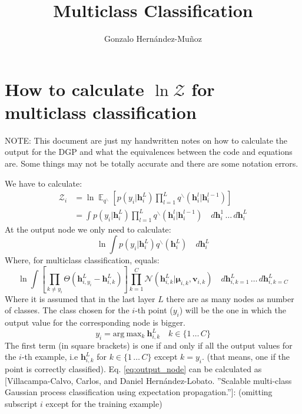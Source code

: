 \documentclass[]{article}
\title{Multiclass Classification}
\author{Gonzalo Hernández-Muñoz}
\DeclareMathOperator{\EX}{\mathbb{E}}%
\newcommand{\mbf}[1]{\ensuremath{\mathbf{#1}}}
\begin{document}
\maketitle

\section{How to calculate $\ln \mathcal{Z}$ for multiclass classification}
NOTE: This document are just my handwritten notes on how to calculate the output for the DGP and what the equivalences between the code and equations are. Some things may not be totally accurate and there are some notation errors. \linebreak

We have to calculate:
\begin{align}
\mathcal{Z}_i &= \ln \EX_{q^\backslash}[p({y}_i | \mbf{h}_i^L) \prod_{l=1}^L q^\backslash(\mbf{h}_i^l| \mbf{h}_i^{l-1})] \\
&= \int p({y}_i | \mbf{h}_i^L) \prod_{l=1}^L q^\backslash(\mbf{h}_i^l | \mbf{h}_i^{l-1}) \quad d\mbf{h}_i^1 \, \dots \, d\mbf{h}_i^L \nonumber
\end{align}
At the output node we only need to calculate:
\begin{equation}
\ln \int p({y}_i | \mbf{h}_i^L) q^\backslash(\mbf{h}_i^L) \quad  d\mbf{h}_i^L
\end{equation}
Where, for multiclass classification, equals:
\begin{equation}
\label{eq:output_node}
\ln \int  \left[ \prod_{k\neq y_i} \Theta(\mbf{h}_{i, y_i}^L - \mbf{h}_{i,k}^L) \right]
  \prod_{k=1}^C \mathcal{N}(\mbf{h}_{i,k}^L | \bm \mu_{i,k}, \mbf{v}_{i,k} ) 
  \quad d\mbf{h}_{i,k=1}^L \, \dots \, d\mbf{h}_{i,k=C}^L
\end{equation}
Where it is assumed that in the last layer $ L $ there are as many nodes as number of classes. The class chosen for the $i$-th point ($ y_i $) will be the one in which the output value for the corresponding node is bigger.
$$ y_i = \text{arg} \ \text{max}_k \ \mbf{h}_{i, k}^L \quad  k \in \{1\, \dots \, C\} $$
The first term (in square brackets) is one if and only if all the output values for the $i$-th example, i.e $ \mbf{h}^L_{i,k} $ for $ k \in \{1\, \dots \, C\} $ except $ k = y_i $. (that means, one if the point is correctly classified). Eq. \ref{eq:output_node} can be calculated as [Villacampa-Calvo, Carlos, and Daniel Hernández-Lobato. ''Scalable multi-class Gaussian process classification using expectation propagation.'']:
(omitting subscript $i$ except for the training example)
\end{document}
